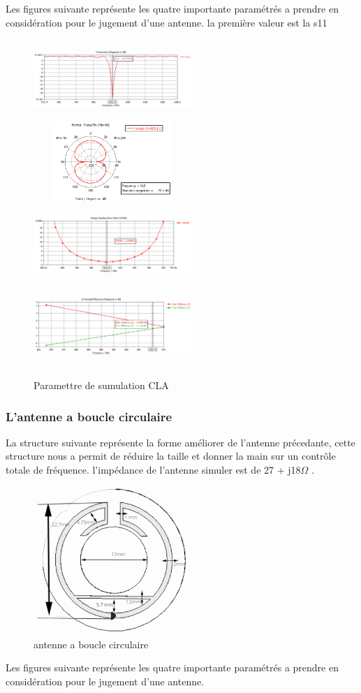 \documentclass[11pt, a4paper, twoside]{book}
\begin{document}
Les figures suivante représente les quatre importante paramétrés a prendre en considération pour le jugement d'une antenne. la première valeur est la s11
\begin{figure}[h]
\centering
\includegraphics[width=6cm,height=3cm]{clas11}
\includegraphics[width=6cm,height=3cm]{clapolfarfield}
\includegraphics[width=6cm,height=3cm]{clavswr}
\includegraphics[width=6cm,height=3cm]{claefficency}
\caption{Paramettre de sumulation CLA}
\end{figure} 

\subsubsection{L'antenne a boucle circulaire}
La structure suivante représente  la forme améliorer de l'antenne précedante, cette structure nous a permit de réduire la taille et donner la main sur un contrôle totale de fréquence. l'impédance de l'antenne simuler est  de 27 + j18\(\Omega\)
.
\begin{figure}[H]
\centering
\includegraphics[width=6cm]{1STee}
\caption{antenne a boucle circulaire}
\end{figure}
Les figures suivante représente les quatre importante paramétrés a prendre en considération pour le jugement d'une antenne.
\end{document}
